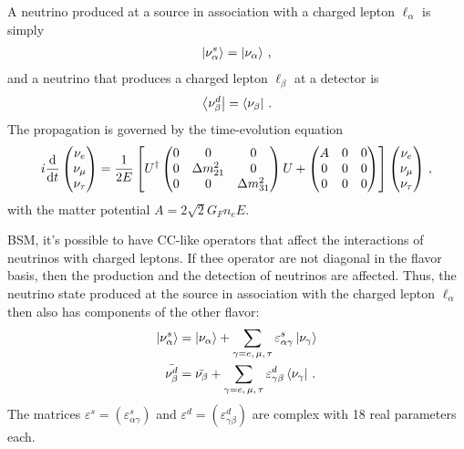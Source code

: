 \documentclass[twocolumn]{article}
\newcommand{\na}{\ensuremath{\nu_\alpha}}
\newcommand{\nb}{\ensuremath{\nu_\beta}}
\renewcommand{\a}{\ensuremath{\alpha}}
\renewcommand{\b}{\ensuremath{\beta}}
\renewcommand{\ne}{\ensuremath{\nu_e}}
\newcommand{\nm}{\ensuremath{\nu_\mu}}
\newcommand{\nt}{\ensuremath{\nu_\tau}}
\newcommand*{\dm}[1][]{%
  \Delta m^2\ifx\\#1\\\else_\text{#1}\fi
}
\begin{document}
A neutrino produced at a source in association with a charged lepton $\ell_\a$ is simply
\begin{align*}
  \ket{\na^s} = \ket{\na}
\,,\end{align*}
and a neutrino that produces a charged lepton $\ell_\b$ at a detector is
\begin{align*}
  \bra{\nb^d} = \bra{\nb}
\,.\end{align*}
The propagation is governed by the time-evolution equation
\begin{align*}
  i \dv{}{t} \begin{pmatrix} 
                \ne \\ \nm \\ \nt
             \end{pmatrix}
  = \frac{1}{2E} 
  \left[ 
    U^\dagger \begin{pmatrix} 
                0 & 0 & 0 \\
                0 & \dm[21] & 0 \\
                0 & 0 & \dm[31]
              \end{pmatrix} 
    U +
    \begin{pmatrix} 
      A & 0 & 0 \\
      0 & 0 & 0 \\
      0 & 0 & 0
    \end{pmatrix}
  \right]
  \begin{pmatrix} 
    \ne \\ \nm \\ \nt
  \end{pmatrix}
\,,\end{align*}
with the matter potential $A = 2\sqrt{2}G_F n_e E $.

BSM, it's possible to have CC-like operators that affect the interactions of neutrinos with charged leptons. If thee operator are not diagonal in the flavor basis, then the production and the detection of neutrinos are affected. Thus, the neutrino state produced at the source in association with the charged lepton $\ell_\a$ then also has components of the other flavor:
\begin{align*}
  \ket{\na^s} &= \ket{\na} + \sum_{\gamma = e,\,\mu,\,\tau} \varepsilon_{\a \gamma}^s \ket{\nu_\gamma} \\
  \bar{\nb^d} &= \bar{\nb} + \sum_{\gamma = e,\,\mu,\,\tau} \varepsilon_{\gamma \b}^d \bra{\nu_\gamma}
\,.\end{align*}
The matrices $\varepsilon^s = (\varepsilon_{\a \gamma}^s)$ and $\varepsilon^d = (\varepsilon^d_{\gamma \beta})$ are complex with 18 real parameters each.
\end{document}

